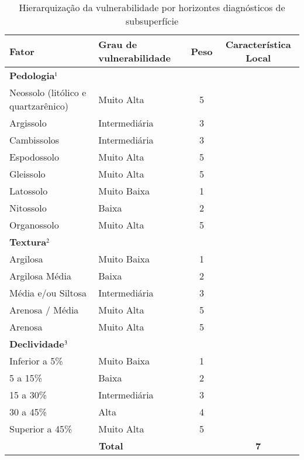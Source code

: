 \begin{table}[htb!]
	\centering
	\caption{Hierarquização da vulnerabilidade por horizontes diagnósticos
		de subsuperfície}
	\label{tab:estab}
	\begin{tabularx}{\textwidth}{@{\hspace{1cm}}Xlcc}	
		\toprule
		\bfseries Fator & 
		\bfseries Grau de vulnerabilidade &
		\bfseries Peso&
		\multicolumn{1}{c}{\bfseries Característica Local} \\
		\midrule
		\multicolumn{3}{l}{\bfseries Pedologia$\footnotesize^1$}\\\cmidrule{1-1}
		Neossolo  (litólico e quartzarênico) & Muito Alta & 5 & \Square\\
		Argissolo   & Intermediária&3 & \Square\\
		Cambissolos & Intermediária &3& \Square\\
		Espodossolo & Muito Alta &5& \Square\\
		Gleissolo   & Muito Alta &5& \Square\\
		Latossolo   & Muito Baixa &1& \Square\\
		Nitossolo   & Baixa &2& \CheckedBox\\
		Organossolo & Muito Alta &5& \Square\\
		
		\multicolumn{3}{l}{\bfseries Textura$\footnotesize^2$}\\\cmidrule{1-1}
		Argilosa & Muito Baixa  &  1& \CheckedBox\\
		Argilosa Média & Baixa  & 2& \Square\\
		Média e/ou Siltosa & Intermediária  & 3& \Square\\
		Arenosa / Média  &  Muito Alta & 5& \Square\\
		Arenosa  & Muito Alta  & 5& \Square\\
		
		\multicolumn{3}{l}{\bfseries Declividade$\footnotesize^3$}\\\cmidrule{1-1}
		Inferior a 5\% & Muito Baixa & 1& \Square\\
		5 a 15\% & Baixa & 2& \CheckedBox\\
		15 a 30\% & Intermediária & 3& \Square\\
		30 a 45\% & Alta & 4& \Square\\
		Superior a 45\% & Muito Alta & 5& \Square\\
		\midrule
		\multicolumn{3}{c}{\bfseries Total} & \bfseries7\\
		
		\bottomrule
	\end{tabularx}
\end{table}

